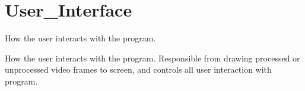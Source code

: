 \hypertarget{group___user___interface}{
\section{\-User\-\_\-\-Interface}
\label{group___user___interface}
}


\-How the user interacts with the program.  


\-How the user interacts with the program. \-Responsible from drawing processed or unprocessed video frames to screen, and controls all user interaction with program. 